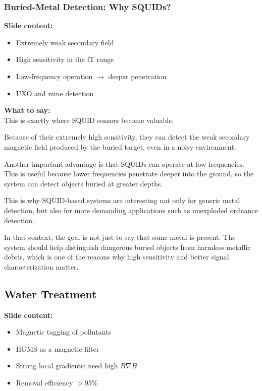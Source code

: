 \documentclass[11pt,a4paper]{article}
\newcommand{\points}[1]{{\color{accent}\textbf{Slide content:}}\\#1}
\newcommand{\speech}[1]{{\color{accent}\textbf{What to say:}}\\#1}
\begin{document}

\subsubsection{Buried-Metal Detection: Why SQUIDs?}

\points{
\begin{itemize}
\item Extremely weak secondary field
\item High sensitivity in the fT range
\item Low-frequency operation \(\rightarrow\) deeper penetration
\item UXO and mine detection
\end{itemize}
}

\speech{
This is exactly where SQUID sensors become valuable.

Because of their extremely high sensitivity, they can detect the weak secondary magnetic field produced by the buried target, even in a noisy environment.

Another important advantage is that SQUIDs can operate at low frequencies. This is useful because lower frequencies penetrate deeper into the ground, so the system can detect objects buried at greater depths.

This is why SQUID-based systems are interesting not only for generic metal detection, but also for more demanding applications such as unexploded ordnance detection.

In that context, the goal is not just to say that some metal is present. The system should help distinguish dangerous buried objects from harmless metallic debris, which is one of the reasons why high sensitivity and better signal characterization matter.
}


\subsection{Water Treatment}

\points{
\begin{itemize}
\item Magnetic tagging of pollutants
\item HGMS as a magnetic filter
\item Strong local gradients: need high $B \nabla B$
\item Removal efficiency $>$95\%
\end{itemize}
}
\end{document}
